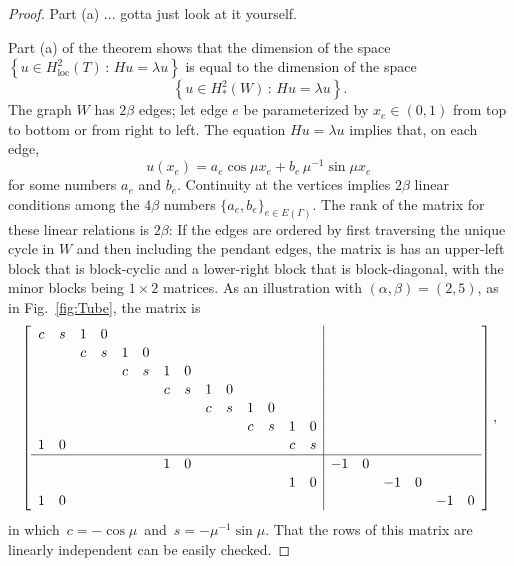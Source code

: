 \documentclass[12pt]{article}
\newcommand{\Hloc}{H^2_\text{loc}}
\newcommand{\Hstar}{H^2_*}
\begin{document}
\begin{proof}
  Part (a) ... gotta just look at it yourself.
  
  Part (a) of the theorem shows that the dimension of the space $\left\{ u\in\Hloc(T) \,:\, Hu = \lambda u \right\}$ is equal to the dimension of the space
%
\begin{equation}
  \left\{ u\in\Hstar(W) \,:\, Hu=\lambda u \right\}.
\end{equation}
%
The graph $W$ has $2\beta$ edges; let edge $e$ be parameterized by $x_e\in(0,1)$ from top to bottom or from right to left.  The equation $Hu=\lambda u$ implies that, on each edge,
%
\begin{equation}
  u(x_e) = a_e \cos \mu x_e + b_e\, \mu^{-1} \sin \mu x_e\,
\end{equation}
%
for some numbers $a_e$ and $b_e$.  Continuity at the vertices implies $2\beta$ linear conditions among the $4\beta$ numbers $\{a_e,b_e\}_{e\in E(\Gamma)}$.  The rank of the matrix for these linear relations is $2\beta$:  If the edges are ordered by first traversing the unique cycle in $W$ and then including the pendant edges, the matrix is has an upper-left block that is block-cyclic and a lower-right block that is block-diagonal, with the minor blocks being $1\!\times\!2$ matrices.
As an illustration with $(\alpha,\beta)=(2,5)$, as in Fig.~\ref{fig:Tube}, the matrix is
%
\begin{equation}
  \renewcommand{\arraystretch}{1.1}
\left[
\begin{array}{cccccccccccccc|cccccc}
  c&s&1&0&&&&&&&&&&&&&&&& \\
  &&c&s&1&0&&&&&&&&&&&&&& \\
  &&&&c&s&1&0&&&&&&&&&&&& \\
  &&&&&&c&s&1&0&&&&&&&&&& \\
  &&&&&&&&c&s&1&0&&&&&&&& \\
  &&&&&&&&&&c&s&1&0&&&&&& \\
  1&0&&&&&&&&&&&c&s&&&&&& \\
  \hline
   &&&&&&1&0&&&&&&&-1&0&&&& \\
   &&&&&&&&&&&&1&0&&&-1&0&& \\
   1&0&&&&&&&&&&&&&&&&&-1&0   
\end{array}
\right],
\end{equation}
%
in which \,$c=-\cos\mu$\, and \,$s=-\mu^{-1}\sin\mu$.
That the rows of this matrix are linearly independent can be easily checked.


\end{proof}
\end{document}

